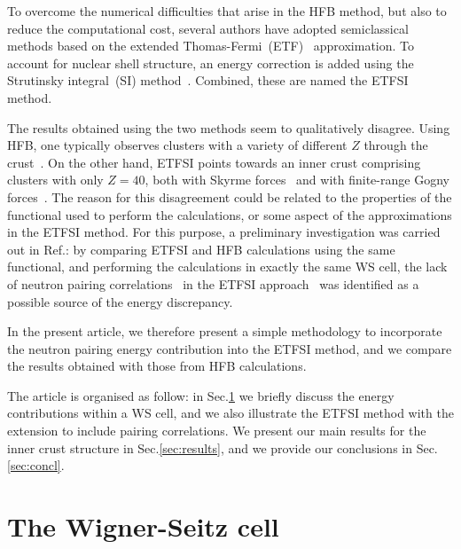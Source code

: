 \documentclass[
    amsmath,amssymb,
    aps,
    prc,
    floatfix,
]{revtex4-2}
\begin{document}
To overcome the numerical difficulties that arise in the HFB method, but also to reduce the computational cost, several authors have adopted semiclassical methods based on the extended Thomas-Fermi~(ETF)~\cite{brack1976extended} approximation. To account for nuclear shell structure, an energy correction is added using the Strutinsky integral~(SI) method~\cite{pearsonInnerCrustNeutron2012}. Combined, these are named the ETFSI method.

The results obtained using the two methods seem to qualitatively disagree. Using HFB, one typically observes clusters with a variety of different $Z$ through the crust~\cite{grill2011cluster,pastore2017new}. On the other hand, ETFSI points towards an inner crust comprising clusters with only $Z=40$, both with Skyrme forces~\cite{pearsonInnerCrustNeutron2012,pearson2015role,pearsonUnifiedEquationsState2018,pearsonErratumUnifiedEquations2019} and with finite-range Gogny forces~\cite{mondalStructureCompositionInner2020}. The reason for this disagreement could be related to the properties of the functional used to perform the calculations, or some aspect of the approximations in the ETFSI method. For this purpose, a preliminary investigation was carried out in Ref.\cite{shelley2020accurately}: by comparing ETFSI and HFB calculations using the same functional, and performing the calculations in exactly the same WS cell, the lack of neutron pairing correlations~\cite{pastore2013pairing} in the ETFSI approach~\cite{pearson2015role} was identified as a possible source of the energy discrepancy.

In the present article, we therefore present a simple methodology to incorporate the neutron pairing energy contribution into the ETFSI method, and we compare the results obtained with those from HFB calculations.

The article is organised as follow: in Sec.\ref{sec:ws} we briefly discuss the energy contributions within a WS cell, and we also illustrate the ETFSI method with the extension to include pairing correlations. We present our main results for the inner crust structure in Sec.\ref{sec:results}, and we provide our conclusions in Sec.\ref{sec:concl}.


\section{The Wigner-Seitz cell}\label{sec:ws}
\end{document}
